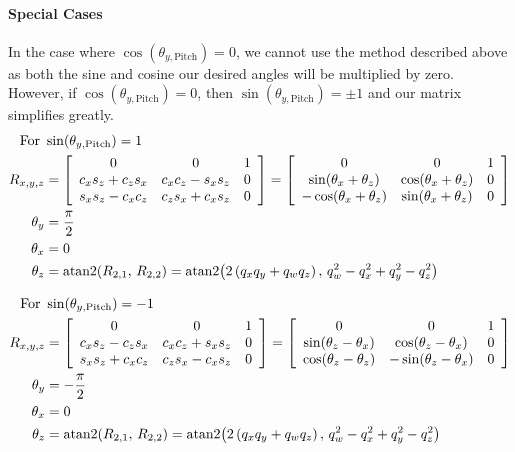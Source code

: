 \documentclass[letterpaper,10pt]{article}
\begin{document}
\paragraph{Special Cases}
In the case where $\cos\!\left(\theta_{y,\text{Pitch}}\right) = 0$, we cannot use the method described above as both the sine and cosine our desired angles will be multiplied by zero. However, if $\cos\!\left(\theta_{y,\text{Pitch}}\right) = 0$, then $\sin\!\left(\theta_{y,\text{Pitch}}\right) = \pm1$ and our matrix simplifies greatly.
\begin{align}
\nonumber \text{For } & \sin\!\left(\theta_{y,\text{Pitch}}\right) = 1 \\
R_{x,y,z} &= \left[\begin{array}{c c c} 0 & 0 & 1 \\ c_x s_z + c_z s_x & c_x c_z - s_x s_z & 0 \\ s_x s_z - c_x c_z & c_z s_x + c_x s_z & 0\end{array} \right] = \left[\begin{array}{c c c} 0 & 0 & 1 \\ \sin\!\left(\theta_x + \theta_z\right) & \cos\!\left(\theta_x + \theta_z\right) & 0 \\ -\cos\!\left(\theta_x + \theta_z\right) & \sin\!\left(\theta_x + \theta_z\right) & 0\end{array} \right] \\
\theta_y &= \dfrac{\pi}{2} \\
\theta_x &= 0 \\
\theta_z &= \mathrm{atan2}\!\left(R_{2,1}, \, R_{2,2}\right) = \mathrm{atan2}\!\left(2\left(q_x q_y + q_w q_z\right), \, q_w^2 - q_x^2 + q_y^2 - q_z^2 \right)
\end{align}

\begin{align}
\nonumber \text{For } & \sin\!\left(\theta_{y,\text{Pitch}}\right) = -1 \\
R_{x,y,z} &= \left[\begin{array}{c c c} 0 & 0 & 1 \\ c_x s_z - c_z s_x & c_x c_z + s_x s_z & 0 \\ s_x s_z + c_x c_z & c_z s_x - c_x s_z & 0\end{array} \right] = \left[\begin{array}{c c c} 0 & 0 & 1 \\ \sin\!\left(\theta_z - \theta_x\right) & \cos\!\left(\theta_z - \theta_x\right) & 0\\ \cos\!\left(\theta_z - \theta_z\right) & -\sin\!\left(\theta_z - \theta_x\right) & 0\end{array} \right] \\
\theta_y &= -\dfrac{\pi}{2} \\
\theta_x &= 0 \\
\theta_z &= \mathrm{atan2}\!\left(R_{2,1}, \, R_{2,2}\right) = \mathrm{atan2}\!\left(2\left(q_x q_y + q_w q_z\right), \, q_w^2 - q_x^2 + q_y^2 - q_z^2 \right) \\
\end{align}
\end{document}
